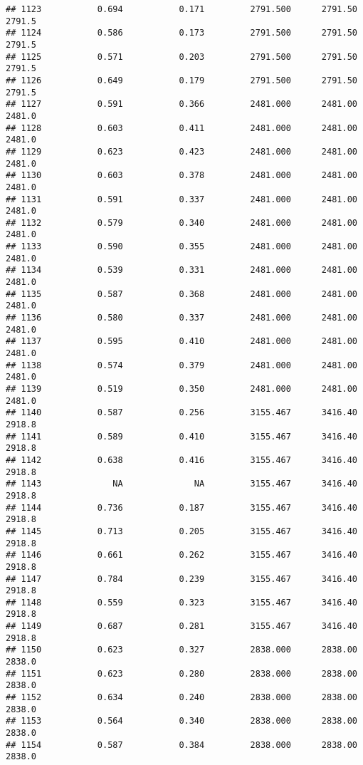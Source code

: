 \documentclass[
]{article}
\begin{document}
\begin{verbatim}
## 1123           0.694           0.171         2791.500      2791.50       2791.5
## 1124           0.586           0.173         2791.500      2791.50       2791.5
## 1125           0.571           0.203         2791.500      2791.50       2791.5
## 1126           0.649           0.179         2791.500      2791.50       2791.5
## 1127           0.591           0.366         2481.000      2481.00       2481.0
## 1128           0.603           0.411         2481.000      2481.00       2481.0
## 1129           0.623           0.423         2481.000      2481.00       2481.0
## 1130           0.603           0.378         2481.000      2481.00       2481.0
## 1131           0.591           0.337         2481.000      2481.00       2481.0
## 1132           0.579           0.340         2481.000      2481.00       2481.0
## 1133           0.590           0.355         2481.000      2481.00       2481.0
## 1134           0.539           0.331         2481.000      2481.00       2481.0
## 1135           0.587           0.368         2481.000      2481.00       2481.0
## 1136           0.580           0.337         2481.000      2481.00       2481.0
## 1137           0.595           0.410         2481.000      2481.00       2481.0
## 1138           0.574           0.379         2481.000      2481.00       2481.0
## 1139           0.519           0.350         2481.000      2481.00       2481.0
## 1140           0.587           0.256         3155.467      3416.40       2918.8
## 1141           0.589           0.410         3155.467      3416.40       2918.8
## 1142           0.638           0.416         3155.467      3416.40       2918.8
## 1143              NA              NA         3155.467      3416.40       2918.8
## 1144           0.736           0.187         3155.467      3416.40       2918.8
## 1145           0.713           0.205         3155.467      3416.40       2918.8
## 1146           0.661           0.262         3155.467      3416.40       2918.8
## 1147           0.784           0.239         3155.467      3416.40       2918.8
## 1148           0.559           0.323         3155.467      3416.40       2918.8
## 1149           0.687           0.281         3155.467      3416.40       2918.8
## 1150           0.623           0.327         2838.000      2838.00       2838.0
## 1151           0.623           0.280         2838.000      2838.00       2838.0
## 1152           0.634           0.240         2838.000      2838.00       2838.0
## 1153           0.564           0.340         2838.000      2838.00       2838.0
## 1154           0.587           0.384         2838.000      2838.00       2838.0

\end{verbatim}
\end{document}
